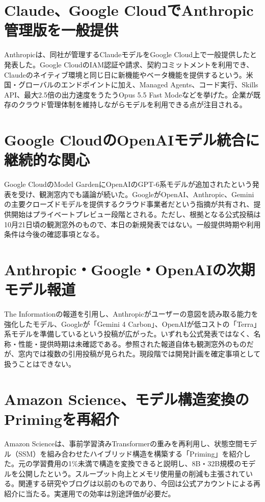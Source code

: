 \section{Claude、Google CloudでAnthropic管理版を一般提供}
Anthropicは、同社が管理するClaudeモデルをGoogle Cloud上で一般提供したと発表した。Google CloudのIAM認証や請求、契約コミットメントを利用でき、Claudeのネイティブ環境と同じ日に新機能やベータ機能を提供するという。米国・グローバルのエンドポイントに加え、Managed Agents、コード実行、Skills API、最大2.5倍の出力速度をうたうOpus 5.5 Fast Modeなどを挙げた。企業が既存のクラウド管理体制を維持しながらモデルを利用できる点が注目される。

\section{Google CloudのOpenAIモデル統合に継続的な関心}
Google CloudのModel GardenにOpenAIのGPT-6系モデルが追加されたという発表を受け、観測窓内でも議論が続いた。GoogleがOpenAI、Anthropic、Geminiの主要クローズドモデルを提供するクラウド事業者だという指摘が共有され、提供開始はプライベートプレビュー段階とされる。ただし、根拠となる公式投稿は10月21日頃の観測窓外のもので、本日の新規発表ではない。一般提供時期や利用条件は今後の確認事項となる。

\section{Anthropic・Google・OpenAIの次期モデル報道}
The Informationの報道を引用し、Anthropicがユーザーの意図を読み取る能力を強化したモデル、Googleが「Gemini 4 Carbon」、OpenAIが低コストの「Terra」系モデルを準備しているという投稿が広がった。いずれも公式発表ではなく、名称・性能・提供時期は未確認である。参照された報道自体も観測窓外のものだが、窓内では複数の引用投稿が見られた。現段階では開発計画を確定事項として扱うことはできない。

\section{Amazon Science、モデル構造変換のPrimingを再紹介}
Amazon Scienceは、事前学習済みTransformerの重みを再利用し、状態空間モデル（SSM）を組み合わせたハイブリッド構造を構築する「Priming」を紹介した。元の学習費用の1\%未満で構造を変換できると説明し、8B・32B規模のモデルを公開したという。スループット向上とメモリ使用量の削減も主張されている。関連する研究やブログは以前のものであり、今回は公式アカウントによる再紹介に当たる。実運用での効率は別途評価が必要だ。


